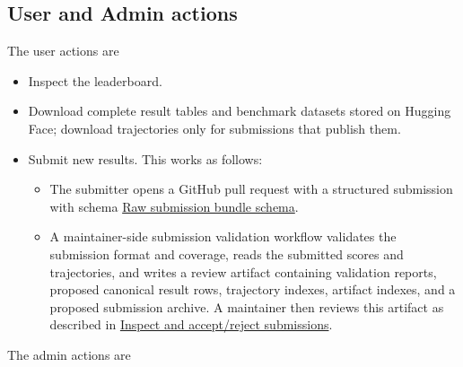 \documentclass[11pt]{article}
\begin{document}
\subsection*{User and Admin actions}
The user actions are
\begin{itemize}
\item Inspect the leaderboard.
\item Download complete result tables and benchmark datasets stored on Hugging Face; download trajectories only for submissions that publish them.
\item Submit new results. 
This works as follows:
\begin{itemize}
  \item The submitter opens a GitHub pull request with a structured submission with schema \hyperref[sec:website-raw-submission-bundle]{Raw submission bundle schema}.
  \item A maintainer-side submission validation workflow validates the submission format and coverage, reads the submitted scores and trajectories, and writes a review artifact containing validation reports, proposed canonical result rows, trajectory indexes, artifact indexes, and a proposed submission archive.
  A maintainer then reviews this artifact as described in \hyperref[sec:website-admin-review-submissions]{Inspect and accept/reject submissions}.

\end{itemize}
\end{itemize}
The admin actions are
\end{document}
